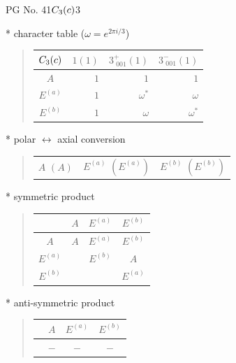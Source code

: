 \documentclass[fleqn,8pt,landscape]{jsarticle}
\begin{document}
\setcounter{MaxMatrixCols}{32}

\renewcommand{\tablename}{Table~}
\renewcommand{\figurename}{Figure~}
\begin{center}
\LARGE
PG No. 41\quad$C_{\rm 3}(c)$\quad$3$\quad[ trigonal ]
\end{center}

* character table ($\omega=e^{2\pi i/3}$)
\begin{quote}
\begin{tabular}{crrr} \hline \hline
$ C_{\rm 3}(c) $ & $ 1(1) $ & $ 3^{+}_{\,\,001}(1) $ & $ 3^{-}_{\,\,001}(1) $ \\ \hline
$ A $ & $ 1 $ & $ 1 $ & $ 1 $ \\
$ E^{(a)} $ & $ 1 $ & $ \omega^{*} $ & $ \omega $ \\
$ E^{(b)} $ & $ 1 $ & $ \omega $ & $ \omega^{*} $ \\
 \hline \hline
\end{tabular}
\end{quote}

* polar $\leftrightarrow$ axial conversion
\begin{quote}
\begin{tabular}{ccc}
$ A\,\,(A) $ & $ E^{(a)}\,\,(E^{(a)}) $ & $ E^{(b)}\,\,(E^{(b)}) $
\end{tabular}
\end{quote}

* symmetric product
\begin{quote}
\begin{tabular}{c|ccc} \hline \hline
 & $ A $ & $ E^{(a)} $ & $ E^{(b)} $ \\ \hline
$ A $ & $ A $ & $ E^{(a)} $ & $ E^{(b)} $ \\
$ E^{(a)} $ & $  $ & $ E^{(b)} $ & $ A $ \\
$ E^{(b)} $ & $  $ & $  $ & $ E^{(a)} $ \\
 \hline \hline
\end{tabular}
\end{quote}

* anti-symmetric product
\begin{quote}
\begin{tabular}{cccc} \hline \hline
 & $ A $ & $ E^{(a)} $ & $ E^{(b)} $ \\ \hline
$  $ & $ - $ & $ - $ & $ - $ \\
 \hline \hline
\end{tabular}
\end{quote}
\end{document}
